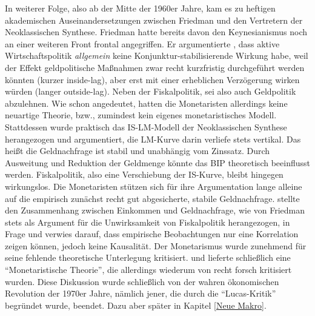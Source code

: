 In weiterer Folge, also ab der Mitte der 1960er Jahre, kam es zu heftigen akademischen Auseinandersetzungen zwischen Friedman und den Vertretern der Neoklassischen Synthese. Friedman hatte bereits davon den Keynesianismus noch an einer weiteren Front frontal angegriffen. Er argumentierte \parencite{Friedman1961}, dass aktive Wirtschaftspolitik \textit{allgemein} keine Konjunktur-stabilisierende Wirkung habe, weil der Effekt geldpolitische Maßnahmen zwar recht kurzfristig durchgeführt werden könnten (kurzer inside-lag), aber erst mit einer erheblichen Verzögerung wirken würden (langer outside-lag). Neben der Fiskalpolitik, sei also auch Geldpolitik abzulehnen. 
Wie schon angedeutet, hatten die Monetaristen allerdings keine neuartige Theorie, bzw., zumindest kein eigenes monetaristisches Modell. Stattdessen wurde praktisch das IS-LM-Modell der Neoklassischen Synthese herangezogen und argumentiert, die LM-Kurve darin verliefe stets vertikal. Das heißt die Geldnachfrage ist stabil und unabhängig vom Zinssatz. Durch Ausweitung und Reduktion der Geldmenge könnte das BIP theoretisch beeinflusst werden. Fiskalpolitik, also eine Verschiebung der IS-Kurve, bleibt hingegen wirkungslos. Die Monetaristen stützen sich für ihre Argumentation lange alleine auf die empirisch zunächst recht gut abgesicherte, stabile Geldnachfrage.  \textcite{Tobin1970} stellte den Zusammenhang zwischen Einkommen und Geldnachfrage, wie von Friedman stets als Argument für die Unwirksamkeit von Fiskalpolitik herangezogen, in Frage und verwies darauf, dass empirische Beobachtungen nur eine Korrelation zeigen können, jedoch keine Kausalität. Der Monetarismus wurde zunehmend für seine fehlende theoretische Unterlegung kritisiert. \textcite{Friedman1970} und \textcite{Friedman1971a} lieferte schließlich eine "`Monetaristische Theorie"', die allerdings wiederum von \textcite{Tobin1972} recht forsch kritisiert wurden. Diese Diskussion wurde schließlich von der wahren ökonomischen Revolution der 1970er Jahre, nämlich jener, die durch die "`Lucas-Kritik"' begründet wurde, beendet. Dazu aber später in Kapitel \ref{Neue Makro}.

